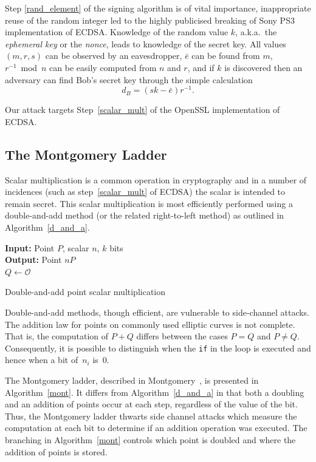 \documentclass[twocolumn]{svjour3}
\newcommand{\myupcase}[1]{\uppercase{#1}}
\begin{document}
Step \ref{rand_element} of the signing algorithm is of vital importance, inappropriate reuse of the random integer led to the highly publicised breaking of Sony PS3 implementation of \myupcase{ecdsa}. 
Knowledge of the random value $k$, a.k.a.\ the \textit{ephemeral key} or the \textit{nonce}, leads to knowledge of the secret key.
All values $(m,r,s)$ can be observed by an eavesdropper, $\bar{e}$ can be found from $m$, $r^{-1}\bmod n$ can be easily computed from $n$ and $r$, and if $k$ is discovered then an adversary can find Bob's secret key through the simple calculation $$d_B=(sk-\bar{e})r^{-1}.$$

Our attack targets Step~\ref{scalar_mult} of the OpenSSL implementation of \myupcase{ecdsa}.

\subsection{The Montgomery Ladder}\label{sub:montgomery}
Scalar multiplication is a common operation in cryptography and in a number of incidences (such as step~\ref{scalar_mult} of \myupcase{ecdsa}) the scalar is intended to remain secret. This scalar multiplication is most efficiently performed using a double-and-add method (or the related right-to-left method) as outlined in Algorithm~\ref{d_and_a}.\\

\vspace{-0.8cm}
\begin{algorithm}[htb]\label{d_and_a}
\SetAlgoLined
{\bf Input:} Point $P$, scalar $n$, $k$ bits\\
{\bf Output:} Point $nP$\\
$Q\gets \mathcal{O}$\\
 \caption{Double-and-add point scalar multiplication}
\end{algorithm}\vspace{-0.5cm}
Double-and-add methods, though efficient, are vulnerable to side-channel attacks. %
The addition law for points on commonly used elliptic curves is not complete.
That is, the computation of $P+Q$ differs between the cases $P=Q$ and $P\neq Q.$ Consequently, 
it is possible to distinguish when the \texttt{if} in the  loop is executed and hence when a bit of~$n_i$ is~0.

The Montgomery ladder, described in Montgomery~\cite{montgomery87speeding}, is presented in Algorithm~\ref{mont}. 
It differs from Algorithm~\ref{d_and_a} in that both a doubling and an addition of points occur at each step, regardless of the value of the bit.
Thus, the Montgomery ladder thwarts side channel attacks which measure the computation at each bit to determine if an addition operation was executed. The branching in Algorithm~\ref{mont} controls which point is doubled and where the addition of points is stored. 
\end{document}
